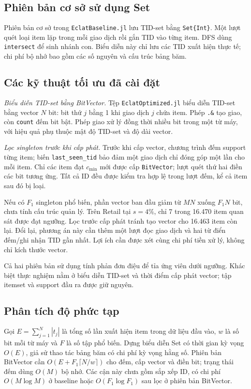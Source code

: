 \subsection{Phiên bản cơ sở sử dụng Set}
Phiên bản cơ sở trong \texttt{EclatBaseline.jl} lưu TID-set bằng \texttt{Set\{Int\}}. Một lượt quét loại item lặp trong mỗi giao dịch rồi gắn TID vào từng item. DFS dùng \texttt{intersect} để sinh nhánh con. Biểu diễn này chỉ lưu các TID xuất hiện thực tế; chi phí bộ nhớ bao gồm các số nguyên và cấu trúc bảng băm.

\subsection{Các kỹ thuật tối ưu đã cài đặt}
\textit{Biểu diễn TID-set bằng BitVector.} Tệp \texttt{EclatOptimized.jl} biểu diễn TID-set bằng vector $N$ bit: bit thứ $j$ bằng 1 khi giao dịch $j$ chứa item. Phép \texttt{.\&} tạo giao, còn \texttt{count} đếm bit bật. Phép giao xử lý đồng thời nhiều bit trong một từ máy, với hiệu quả phụ thuộc mật độ TID-set và độ dài vector.

\textit{Lọc singleton trước khi cấp phát.} Trước khi cấp vector, chương trình đếm support từng item; biến \texttt{last\_seen\_tid} bảo đảm một giao dịch chỉ đóng góp một lần cho mỗi item. Chỉ các item đạt $c_{\min}$ mới được cấp \texttt{BitVector}; lượt quét thứ hai điền các bit tương ứng. Tất cả ID đều được kiểm tra hợp lệ trong lượt đếm, kể cả item sau đó bị loại.

Nếu có $F_1$ singleton phổ biến, phần vector ban đầu giảm từ $MN$ xuống $F_1N$ bit, chưa tính cấu trúc quản lý. Trên Retail tại $s=4\%$, chỉ 7 trong 16.470 item quan sát được đạt ngưỡng. Lọc trước cấp phát tránh tạo vector cho 16.463 item còn lại. Đổi lại, phương án này cần thêm một lượt đọc giao dịch và hai từ điển đếm/ghi nhận TID gần nhất. Lợi ích cần được xét cùng chi phí tiền xử lý, không chỉ kích thước vector.


Cả hai phiên bản sử dụng tính phản đơn điệu để tỉa ứng viên dưới ngưỡng. Khác biệt thực nghiệm nằm ở biểu diễn TID-set và thời điểm cấp phát vector; tập itemset và support đầu ra được giữ nguyên.

\subsection{Phân tích độ phức tạp}
Gọi $E=\sum_{j=1}^{N}|t_j|$ là tổng số lần xuất hiện item trong dữ liệu đầu vào, $w$ là số bit mỗi từ máy và $F$ là số tập phổ biến. Dựng biểu diễn Set có thời gian kỳ vọng $O(E)$, giả sử thao tác bảng băm có chi phí kỳ vọng hằng số. Phiên bản BitVector cần $O(E+F_1\lceil N/w\rceil)$ cho đếm, cấp vector và điền bit; trạng thái đếm dùng $O(M)$ bộ nhớ. Các cận này chưa gồm sắp xếp ID, có chi phí $O(M\log M)$ ở baseline hoặc $O(F_1\log F_1)$ sau lọc ở phiên bản BitVector.


